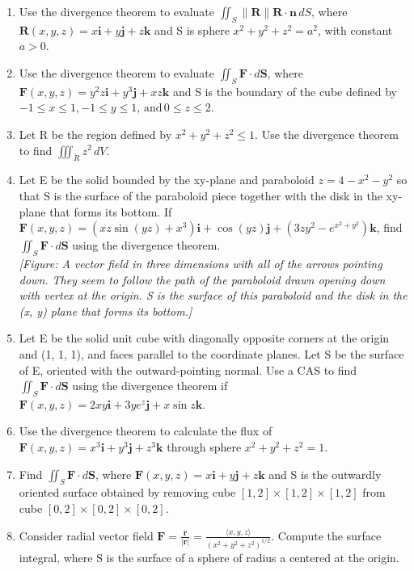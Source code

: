 \documentclass{exercises}
\begin{document}
\begin{enumerate}[resume]
\item Use the divergence theorem to evaluate $\iint_{S}\|\mathbf{R}\|\mathbf{R}\cdot \mathbf{n}\,dS$, where $\mathbf{R}(x,y,z)=x\mathbf{i}+y\mathbf{j}+z\mathbf{k}$ and S is sphere $x^{2}+y^{2}+z^{2}=a^{2}$, with constant $a>0$.
\item Use the divergence theorem to evaluate $\iint_{S}\mathbf{F}\cdot d\mathbf{S}$, where $\mathbf{F}(x,y,z)=y^{2}z\mathbf{i}+y^{3}\mathbf{j}+xz\mathbf{k}$ and S is the boundary of the cube defined by $-1\le x\le1,-1\le y\le1,\,\text{and}\,0\le z\le2$.
\item Let R be the region defined by $x^{2}+y^{2}+z^{2}\le1$. Use the divergence theorem to find $\iiint_{R}z^{2}\,dV$.
\item Let E be the solid bounded by the xy-plane and paraboloid $z=4-x^{2}-y^{2}$ so that S is the surface of the paraboloid piece together with the disk in the xy-plane that forms its bottom. If $\mathbf{F}(x,y,z)=(xz\sin(yz)+x^{3})\mathbf{i}+\cos(yz)\mathbf{j}+(3zy^{2}-e^{x^{2}+y^{2}})\mathbf{k}$, find $\iint_{S}\mathbf{F}\cdot d\mathbf{S}$ using the divergence theorem. \\ \textit{[Figure: A vector field in three dimensions with all of the arrows pointing down. They seem to follow the path of the paraboloid drawn opening down with vertex at the origin. S is the surface of this paraboloid and the disk in the (x, y) plane that forms its bottom.]}
\item Let E be the solid unit cube with diagonally opposite corners at the origin and (1, 1, 1), and faces parallel to the coordinate planes. Let S be the surface of E, oriented with the outward-pointing normal. Use a CAS to find $\iint_{S}\mathbf{F}\cdot d\mathbf{S}$ using the divergence theorem if $\mathbf{F}(x,y,z)=2xy\mathbf{i}+3ye^{z}\mathbf{j}+x\sin z\mathbf{k}$.
\item Use the divergence theorem to calculate the flux of $\mathbf{F}(x,y,z)=x^{3}\mathbf{i}+y^{3}\mathbf{j}+z^{3}\mathbf{k}$ through sphere $x^{2}+y^{2}+z^{2}=1$.
\item Find $\iint_{S}\mathbf{F}\cdot d\mathbf{S}$, where $\mathbf{F}(x,y,z)=x\mathbf{i}+y\mathbf{j}+z\mathbf{k}$ and S is the outwardly oriented surface obtained by removing cube $[1,2]\times [1,2]\times [1,2]$ from cube $[0,2]\times [0,2]\times [0,2]$.
\item Consider radial vector field $\mathbf{F}=\frac{\mathbf{r}}{|\mathbf{r}|}=\frac{\langle x,y,z\rangle}{{(x^{2}+y^{2}+z^{2})}^{1/2}}$. Compute the surface integral, where S is the surface of a sphere of radius a centered at the origin.

\end{enumerate}
\end{document}
